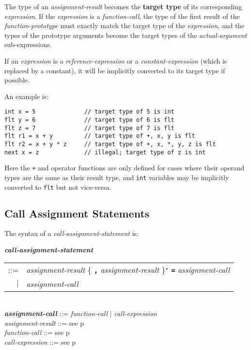 \documentclass[12pt]{article}
\newcommand{\TT}[1]{{\tt \bfseries #1}}
\newcommand{\STAR}{{\Large $^\star$}}
\newcommand{\key}[1]{{\rm \bfseries #1}}
\newcommand{\emkey}[1]{{\em \bfseries #1}}
\newcommand{\pagref}[1]{p\pageref{#1}}
\newenvironment{indpar}[1][0.3in]%
	{\begin{list}{}%
		     {\setlength{\itemsep}{0in}%
		      \setlength{\topsep}{0in}%
		      \setlength{\parsep}{1ex}%
		      \setlength{\labelwidth}{#1}%
		      \setlength{\leftmargin}{#1}%
		      \addtolength{\leftmargin}{\labelsep}}%
	 \item}%
	{\end{list}}
\begin{document}
The type of an {\em assignment-result} becomes the \key{target type}
of its corresponding {\em expression}.  If the {\em expression}
is a {\em function-call}, the type of the first result of the
{\em function-prototype} must exactly match
the target type of the {\em expression},
and the types of the prototype arguments become the target types
of the {\em actual-argument} sub-expressions.

If an {\em expression} is a {\em reference-expression}
or a {\em constant-expression}
(which is replaced by a constant),
it will be implicitly
converted to its target type if possible.

An example is:
\begin{indpar}\begin{verbatim}
int x = 5              // target type of 5 is int
flt y = 6              // target type of 6 is flt
flt z = 7              // target type of 7 is flt
flt r1 = x + y         // target type of +, x, y is flt
flt r2 = x + y * z     // target type of +, x, *, y, z is flt
next x = z             // illegal; target type of z is int
\end{verbatim}\end{indpar}

Here the {\tt +} and {\tt *} operator functions are only defined
for cases where their operand types are the same as their result type,
and {\tt int} variables may be implicitly converted to {\tt flt}
but not vice-versa.

\subsection{Call Assignment Statements}
\label{CALL-ASSIGNMENT-STATEMENTS}

The syntax of a {\em call-assignment-statement} is:
\begin{indpar}
\emkey{call-assignment-statement} \\
\hspace*{0.5in} \begin{tabular}{rl}
                ::= & {\em assignment-result}
                      \{ \TT{,} {\em assignment-result} \}\STAR{}
		      \TT{=} {\em assignment-call} \\
		$|$ & {\em assignment-call}
		\end{tabular}
\\[0.5ex]
\emkey{assignment-call} ::= {\em function-call} $|$
                            {\em call-expression}
\\[0.5ex]
{\em assignment-result} ::= see \pagref{ASSIGNMENT-RESULT}
\\[0.5ex]
{\em function-call} ::= see \pagref{FUNCTION-CALL}
\\[0.5ex]
{\em call-expression} ::= see \pagref{CALL-EXPRESSION}
\end{indpar}
\end{document}
